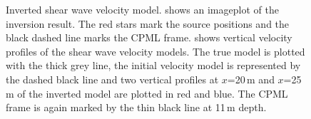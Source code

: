 \begin{figure}[ht]
\centering
{}%
\hspace{0.2 cm}
\caption{Inverted shear wave velocity model. \protect{} shows an imageplot of the inversion result. The red stars mark the source positions and the black dashed line marks the CPML frame. \protect{} shows vertical velocity profiles of the shear wave velocity models. The true model is plotted with the thick grey line, the initial velocity model is represented by the dashed black line and two vertical profiles at $x$=20\,m and $x$=25\,m of the inverted model are plotted in red and blue. The CPML frame is again marked by the thin black line at 11\,m depth.}
\label{Rheinstetten_inversion_result}
\end{figure}

\clearpage
